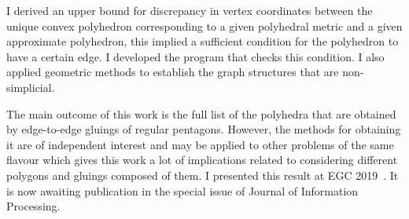 \documentclass[a4paper,11pt]{article}
\theoremstyle{definition}
\begin{document}
I derived an upper bound for discrepancy in vertex coordinates between the unique convex polyhedron corresponding to a given polyhedral metric and a given approximate polyhedron, this implied a sufficient condition for the polyhedron to have a certain edge. I developed the program that checks this condition. I also applied geometric methods to establish the graph structures that are non-simplicial.

The main outcome of this work is the full list of the polyhedra that are obtained by edge-to-edge gluings of regular pentagons. However, the methods for obtaining it are of independent interest and may be applied to other problems of the same flavour which gives this work a lot of implications related to considering different polygons and gluings composed of them. I presented this result at EGC 2019~\cite{egc-penta}. It is now awaiting publication in the special issue of Journal of Information Processing.



\end{document}
